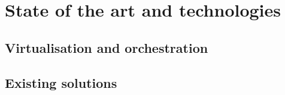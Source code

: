 
\chapter{State of the art and technologies}
\label{ch:estado-arte}


\section{Virtualisation and orchestration}
\label{sec:virtualizacion-orquestacion}


\section{Existing solutions}
\label{sec:soluciones-existentes}

%

